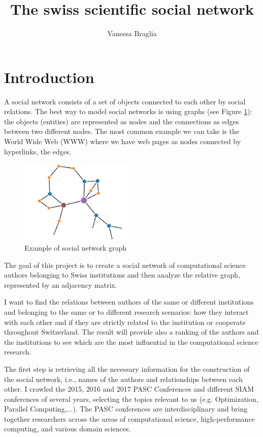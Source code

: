 \documentclass[]{usiinfbachelorproject}
\author{Vanessa Braglia}
\title{The swiss scientific social network}
\begin{document}
\newpage
\tableofcontents
\newpage

\section{Introduction} \label{sec:intro} 

A social network consists of a set of objects connected to each other by social relations. The best way to model social networks is using graphs (see Figure \ref{fig:socialnetwork}): the objects (entities) are represented as nodes and the connections as edges between two different nodes. The most common example we can take is the World Wide Web (WWW) where we have web pages as nodes connected by hyperlinks, the edges.

\begin{figure}[ht]
	\centering
	\includegraphics[height=4cm]{img/graph2.png}
	\caption{Example of social network graph}
	\label{fig:socialnetwork}
\end{figure}

The goal of this project is to create a social network of computational science authors belonging to Swiss institutions and then analyze the relative graph, represented by an adjacency matrix.

I want to find the relations between authors of the same or different institutions and belonging to the same or to different research scenarios: how they interact with each other and if they are strictly related to the institution or cooperate throughout Switzerland. The result will provide also a ranking of the authors and the institutions to see which are the most influential in the computational science research.

The first step is retrieving all the necessary information for the construction of the social network, i.e., names of the authors and relationships between each other. I crawled the 2015, 2016 and 2017 PASC Conferences and different SIAM conferences of several years, selecting the topics relevant to us (e.g. Optimization, Parallel Computing,...). The PASC conferences are interdisciplinary and bring together researchers across the areas of computational science, high-performance computing, and various domain sciences.
\end{document}
